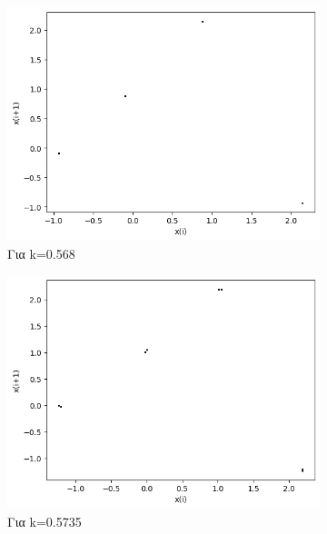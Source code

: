 \begin{figure}[h!]
\begin{subfigure}[b]{0.25\textwidth}
		\includegraphics[width=\textwidth]{LateX images/graphs/k0568}
		\caption{Για k=0.568}
		\label{f:k12}
	\end{subfigure}
	\hfill
	\begin{subfigure}[b]{0.25\textwidth}
		\centering
		\includegraphics[width=\textwidth]{LateX images/graphs/k05735}
		\caption{Για k=0.5735}
		\label{f:k13}
	\end{subfigure}
	\hfill
	\begin{subfigure}[b]{0.25\textwidth}
		\centering

\end{subfigure}
\end{figure}
